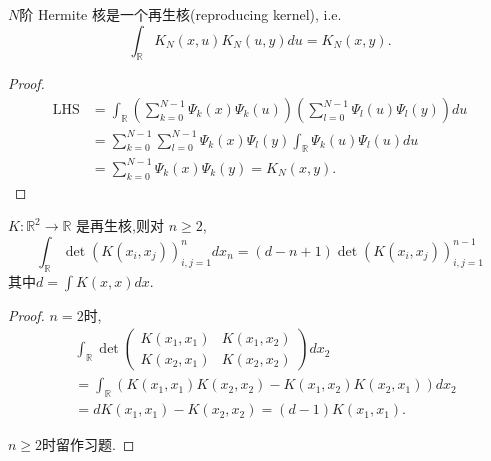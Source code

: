 \begin{prop}
    $N$阶 Hermite 核是一个再生核(reproducing kernel), i.e.
    \[\int_{\mathbb{R}} K_N(x,u) K_N(u,y) du = K_N(x,y).\]
\end{prop}
\begin{proof}
    \begin{equation*}
\begin{aligned}
\text{LHS} &= \int_{\mathbb{R}} \left(\sum_{k=0}^{N-1} \Psi_k(x) \Psi_k(u)\right) \left(\sum_{l=0}^{N-1} \Psi_l(u) \Psi_l(y)\right) du \\
&= \sum_{k=0}^{N-1} \sum_{l=0}^{N-1} \Psi_k(x) \Psi_l(y) \int_{\mathbb{R}} \Psi_k(u) \Psi_l(u) du \\
&= \sum_{k=0}^{N-1} \Psi_k(x) \Psi_k(y) = K_N(x,y).
\end{aligned}
\end{equation*}
\end{proof}

\begin{lemma}
    $K: \mathbb{R}^2 \to \mathbb{R}$ 是再生核,则对 $n \ge 2$,
    $$\int_{\mathbb{R}} \det (K(x_i, x_j))_{i,j=1}^n dx_n = (d-n+1) \det (K(x_i, x_j))_{i,j=1}^{n-1}$$
    其中$d=\int K(x,x)dx$.
\end{lemma}
\begin{proof}
  $n=2$时,
\begin{equation*}
    \begin{aligned}
        &\int_{\mathbb{R}} \det \begin{pmatrix} K(x_1, x_1) & K(x_1, x_2) \\ K(x_2, x_1) & K(x_2, x_2) \end{pmatrix} dx_2\\
        &= \int_{\mathbb{R}} (K(x_1, x_1) K(x_2, x_2) - K(x_1, x_2) K(x_2, x_1)) dx_2\\
        &= d K(x_1, x_1) - K(x_2, x_2) = (d-1) K(x_1, x_1).
    \end{aligned}
\end{equation*}

$n\geq 2$时留作习题.
\end{proof}
  

